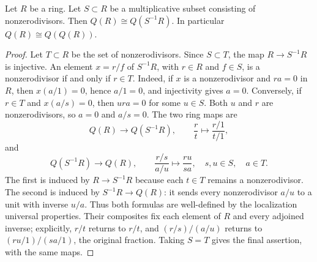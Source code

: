 \begin{lemma}
\label{lemma-total-ring-fractions}
Let $R$ be a ring.
Let $S \subset R$ be a multiplicative subset consisting of nonzerodivisors.
Then $Q(R) \cong Q(S^{-1}R)$.
In particular $Q(R) \cong Q(Q(R))$.
\end{lemma}

\begin{proof}
Let $T\subset R$ be the set of nonzerodivisors.
Since $S\subset T$, the map $R\to S^{-1}R$ is injective.
An element $x=r/f$ of $S^{-1}R$, with $r\in R$ and $f\in S$,
is a nonzerodivisor if and only if $r\in T$.
Indeed, if $x$ is a nonzerodivisor and $ra=0$ in $R$, then
$x(a/1)=0$, hence $a/1=0$, and injectivity gives $a=0$.
Conversely, if $r\in T$ and $x(a/s)=0$, then
$ura=0$ for some $u\in S$. Both $u$ and $r$ are nonzerodivisors,
so $a=0$ and $a/s=0$.
The two ring maps are
$$
Q(R)\longrightarrow Q(S^{-1}R),\qquad
\frac{r}{t}\longmapsto\frac{r/1}{t/1},
$$
and
$$
Q(S^{-1}R)\longrightarrow Q(R),\qquad
\frac{r/s}{a/u}\longmapsto\frac{ru}{sa},
\quad s,u\in S,\quad a\in T.
$$
The first is induced by $R\to S^{-1}R$ because each $t\in T$
remains a nonzerodivisor. The second is induced by $S^{-1}R\to Q(R)$:
it sends every nonzerodivisor $a/u$ to a unit with inverse $u/a$.
Thus both formulas are well-defined by the localization universal
properties. Their composites fix each element of $R$ and every
adjoined inverse; explicitly, $r/t$ returns to $r/t$, and
$(r/s)/(a/u)$ returns to $(ru/1)/(sa/1)$, the original fraction.
Taking $S=T$ gives the final assertion, with the same maps.
\end{proof}